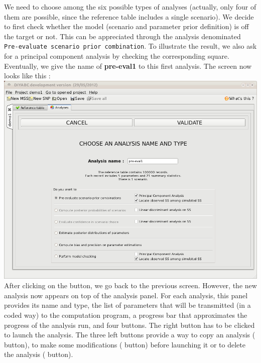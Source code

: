 We need to choose among the six possible types of analyses (actually,
only four of them are possible, since the reference table includes
a single scenario). We decide to first check whether the model (scenario
and parameter prior definition) is off the target or not. This can
be appreciated through the analysis denominated \texttt{Pre-evaluate
scenario prior combination}. To illustrate the result, we also ask
for a principal component analysis by checking the corresponding square.
Eventually, we give the name of \textbf{pre-eval1} to this first analysis.
The screen now looks like this :\\


\includegraphics[scale=0.35]{gui_pictures/Capture-DIYABC-29}\\


After clicking on the  button, we go back
to the previous screen. However, the new analysis now appears on top
of the analysis panel. For each analysis, this panel provides its
name and type, the list of parameters that will be transmitted (in
a coded way) to the computation program, a progress bar that approximates
the progress of the analysis run, and four buttons. The right button
has to be clicked to launch the analysis. The three left buttons provide
a way to copy an analysis ( button), to make
some modifications ( button) before launching
it or to delete the analysis ( button).\\


